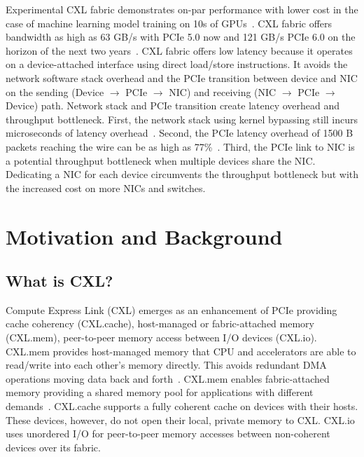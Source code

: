 Experimental CXL fabric demonstrates on-par performance with lower cost in the case of machine learning model training on 10s of GPUs~\cite{fabric-saving}. 
%
CXL fabric offers bandwidth as high as 63 GB/s with PCIe 5.0 now and 121 GB/s PCIe 6.0 on the horizon of the next two years~\cite{pcie-6-7}.
%
%
CXL fabric offers low latency because it operates on a device-attached interface using direct load/store instructions.
%
It avoids the network software stack overhead and the PCIe transition between device and NIC on the sending (Device $\rightarrow$ PCIe $\rightarrow$ NIC) and receiving (NIC $\rightarrow$ PCIe $\rightarrow$ Device) path.
%
Network stack and PCIe transition create latency overhead and throughput bottleneck.
%
First, the network stack using kernel bypassing still incurs microseconds of latency overhead~\cite{shinjuku:nsdi:2019, shenango:nsdi:2019, eRPC:nsdi:2019,snap:sosp:2019}.
%
Second, the PCIe latency overhead of 1500 B packets reaching the wire can be as high as 77\%~\cite{pcie-bench:sigcomm:2018}.
%
Third, the PCIe link to NIC is a potential throughput bottleneck when multiple devices share the NIC.
%
Dedicating a NIC for each device circumvents the throughput bottleneck but with the increased cost on more NICs and switches.

\section{Motivation and Background}
\label{sec:motivation}

\subsection{What is CXL?}
Compute Express Link (CXL) emerges as an enhancement of PCIe providing cache coherency (CXL.cache), host-managed or fabric-attached memory (CXL.mem), peer-to-peer memory access between I/O devices (CXL.io).
%
CXL.mem provides host-managed memory that CPU and accelerators are able to read/write into each other's memory directly. This avoids redundant DMA operations moving data back and forth~\cite{fulcrum:hpca:2020, beacon:micro:2022, intel-cxl:ieee-micro:2023}.
%
CXL.mem enables fabric-attached memory providing a shared memory pool for applications with different demands~\cite{cxl-ssd:hotstorage:2022, directcxl:atc:2022, pond:asplos:2023}.
%
CXL.cache supports a fully coherent cache on devices with their hosts. These devices, however, do not open their local, private memory to CXL. 
%
CXL.io uses unordered I/O for peer-to-peer memory accesses between non-coherent devices over its fabric.
%

